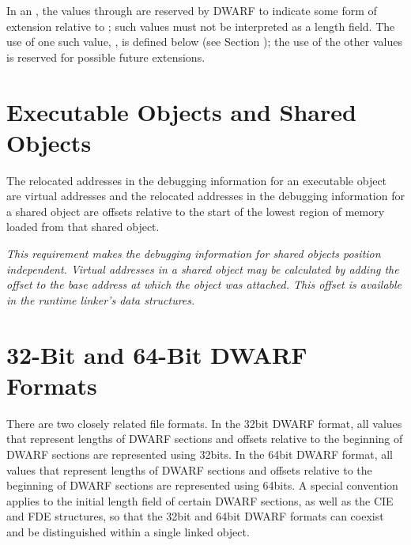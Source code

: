 In an , the values \wfffffffzero through
\wffffffff are reserved by DWARF to indicate some form of
extension relative to ; such values must not
be interpreted as a length field. The use of one such value,
\xffffffff, is defined below 
(see Section ); 
the use of
the other values is reserved for possible future extensions.



\section{Executable Objects and Shared Objects} 
\label{datarep:executableobjectsandsharedobjects}

The relocated addresses in the debugging information for an
executable object are virtual addresses and the relocated
addresses in the debugging information for a shared object
are offsets relative to the start of the lowest region of
memory loaded from that shared object.

\textit{This requirement makes the debugging information for
shared objects position independent.  Virtual addresses in a
shared object may be calculated by adding the offset to the
base address at which the object was attached. This offset
is available in the run\dash time linker\textquoteright s data structures.}



\section{32-Bit and 64-Bit DWARF Formats}
\label{datarep:32bitand64bitdwarfformats}

There are two closely related file formats. In the 32\dash bit DWARF
format, all values that represent lengths of DWARF sections
and offsets relative to the beginning of DWARF sections are
represented using 32\dash bits. In the 64\dash bit DWARF format, all
values that represent lengths of DWARF sections and offsets
relative to the beginning of DWARF sections are represented
using 64\dash bits. A special convention applies to the initial
length field of certain DWARF sections, as well as the CIE and
FDE structures, so that the 32\dash bit and 64\dash bit DWARF formats
can coexist and be distinguished within a single linked object.

